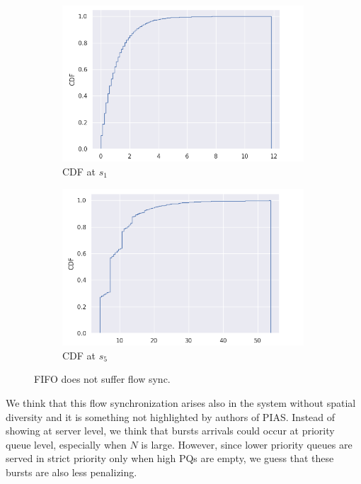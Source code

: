 \begin{figure}
	\centering
	\begin{subfigure}{.45\textwidth}
		\centering
			\includegraphics[width=0.99\textwidth]{Chapter3/Figures/inter_arrival0_FIFO}
		\caption{CDF at $s_1$}
		\label{fig:iatimes-fifo-s1}
	\end{subfigure}%
	\hfill
	\begin{subfigure}{.45\textwidth}
		\centering
		\includegraphics[width=0.99\textwidth]{Chapter3/Figures/inter_arrival4_FIFO}
		\caption{CDF at $s_5$}
		\label{fig:iatimes-fifo-s5}
	\end{subfigure}%
	\caption{FIFO does not suffer flow sync.}
	\label{fig:iatimes-fifo}
\end{figure}%

We think that this flow synchronization arises also in the system without spatial diversity and it is something not highlighted by authors of PIAS. Instead of showing at server level, we think that bursts arrivals could occur at priority queue level, especially when $N$ is large. However, since lower priority queues are served in strict priority only when high PQs are empty, we guess that these bursts are also less penalizing. 
